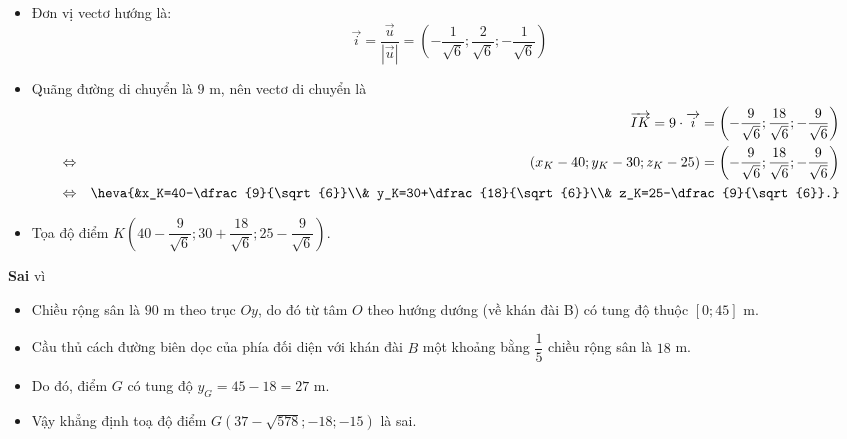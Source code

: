 \begin{ex}
{\begin{itemchoice}
\begin{itemize}
$$		   \left|\overrightarrow{u}\right| = \sqrt{(-1)^2 + 2^2 + (-1)^2} = \sqrt{1 + 4 + 1} = \sqrt{6}
		   $$
		   \item Đơn vị vectơ hướng là:
		   $$
		   \overrightarrow{i} =\dfrac{\overrightarrow{u}}{\left|\overrightarrow{u}\right|}= \left( -\dfrac{1}{\sqrt{6}} ; \dfrac{2}{\sqrt{6}} ; -\dfrac{1}{\sqrt{6}} \right)
		   $$
		   \item Quãng đường di chuyển là $9$ m, nên vectơ di chuyển là
		   \begin{eqnarray*}
			   &&\overrightarrow{IK} = 9 \cdot\overrightarrow{i} = \left( -\dfrac{9}{\sqrt{6}} ; \dfrac{18}{\sqrt{6}} ; -\dfrac{9}{\sqrt{6}} \right)\\
			   &\Leftrightarrow& \left(x_K-40;y_K-30;z_K-25\right)=\left( -\dfrac{9}{\sqrt{6}} ; \dfrac{18}{\sqrt{6}} ; -\dfrac{9}{\sqrt{6}} \right)\\
			   &\Leftrightarrow&\heva{&x_K=40-\dfrac{9}{\sqrt{6}}\\& y_K=30+\dfrac{18}{\sqrt{6}}\\& z_K=25-\dfrac{9}{\sqrt{6}}.}
		   \end{eqnarray*}
		   \item Tọa độ điểm $K\left(40-\dfrac{9}{\sqrt{6}};30+\dfrac{18}{\sqrt{6}};25-\dfrac{9}{\sqrt{6}}\right)$.
	   \end{itemize}
	   \itemch \textbf{Sai} vì\\
	   \begin{itemize}
		\item Chiều rộng sân là $90$ m theo trục $Oy$, do đó từ tâm $O$ theo hướng dướng (về khán đài B) có tung độ thuộc $\left[0;45\right]$ m.
		\item Cầu thủ cách đường biên dọc của phía đối diện với khán đài $B$ một khoảng bằng $\dfrac{1}{5}$ chiều rộng sân là $18$ m.
		\item Do đó, điểm $G$ có tung độ $y_G=45-18=27$ m.
		\item Vậy khẳng định toạ độ điểm $G\left(37-\sqrt{578};-18;-15\right)$ là sai.
	   \end{itemize}
	\end{itemchoice}
}
\end{ex}

